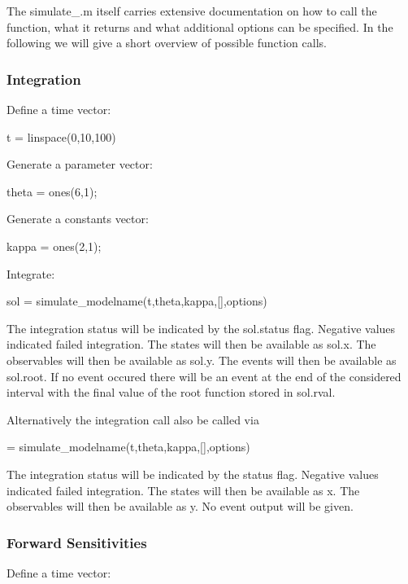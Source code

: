 The simulate\+\_.m itself carries extensive documentation on how to call the function, what it returns and what additional options can be specified. In the following we will give a short overview of possible function calls.\hypertarget{def_simu_integration}{}\subsubsection{Integration}\label{def_simu_integration}
Define a time vector\+:


\begin{DoxyCode}
t = linspace(0,10,100)
\end{DoxyCode}


Generate a parameter vector\+:


\begin{DoxyCode}
theta = ones(6,1);
\end{DoxyCode}


Generate a constants vector\+:


\begin{DoxyCode}
kappa = ones(2,1);
\end{DoxyCode}


Integrate\+:


\begin{DoxyCode}
sol = simulate\_modelname(t,theta,kappa,[],options)
\end{DoxyCode}


The integration status will be indicated by the sol.\+status flag. Negative values indicated failed integration. The states will then be available as sol.\+x. The observables will then be available as sol.\+y. The events will then be available as sol.\+root. If no event occured there will be an event at the end of the considered interval with the final value of the root function stored in sol.\+rval.

Alternatively the integration call also be called via


\begin{DoxyCode}
[status,t,x,y] = simulate\_modelname(t,theta,kappa,[],options)
\end{DoxyCode}


The integration status will be indicated by the status flag. Negative values indicated failed integration. The states will then be available as x. The observables will then be available as y. No event output will be given.\hypertarget{def_simu_forward}{}\subsubsection{Forward Sensitivities}\label{def_simu_forward}
Define a time vector\+:


